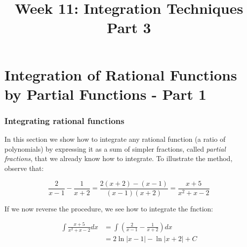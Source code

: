 \documentclass[t]{beamer}
\title{Week 11:  Integration Techniques Part 3}
\theoremstyle{plain}
\theoremstyle{definition}
\begin{document}
\frame{\titlepage}

\setcounter{tocdepth}{2}
\frame{\tableofcontents

}


\section{Integration of Rational Functions by Partial Functions - Part 1 }

\begin{frame}
\frametitle{Integrating rational functions}

In this section we show how to integrate any rational function (a ratio of polynomials) by expressing it as a sum of simpler fractions, called \textit{partial fractions}, that we already know how to integrate. To illustrate the method, observe that:

$$\frac{2}{x-1} - \frac{1}{x+2} = \frac{2(x+2)-(x-1)}{(x-1)(x+2)} = \frac{x + 5}{x^2 + x - 2}$$

If we now reverse the procedure, we see how to integrate the fnction:

\begin{align*}
\displaystyle\int\frac{x+5}{x^2 + x - 2}dx &= \int\left(\frac{2}{x-1} - \frac{1}{x+2}\right)dx\\
&= 2 \ln|x - 1| - \ln|x + 2| + C
\end{align*}


\end{frame}
\end{document}
